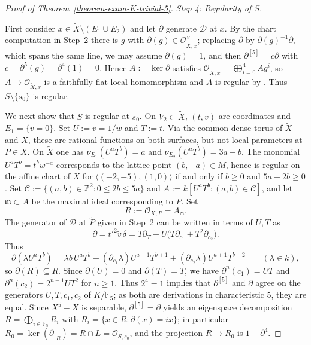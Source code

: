\documentclass[reqno,oneside]{amsart}
\theoremstyle{definition}
\theoremstyle{plain}
\numberwithin{equation}{section}
\begin{document}
\begin{proof}[Proof of Theorem~\ref{theorem-exam-K-trivial-5}]
  \medskip
  \emph{Step 4: Regularity of $S$.}
  
    \medskip
  First consider $x\in\widetilde X\setminus(E_1\cup E_2)$ and let $\partial$ generate $\mathcal D$ at $x$.
  By the chart computation in Step~2 there is $g$ with $\partial(g)\in\mathcal O_{\widetilde X,x}^\times$; replacing $\partial$ by $\partial(g)^{-1}\partial$, which spans the same line, we may assume $\partial(g)=1$, and then $\partial^{[5]}=c\partial$ with $c=\partial^5(g)=\partial^4(1)=0$.
  Hence $A:=\ker\partial$ satisfies $\mathcal O_{\widetilde X,x}=\bigoplus_{i=0}^{4}Ag^i$, so $A\to\mathcal O_{\widetilde X,x}$ is a faithfully flat local homomorphism and $A$ is regular by \cite[Theorem~23.7]{MatsumuraCRT}.
  Thus $S\setminus\{s_0\}$ is regular.

  We next show that $S$ is regular at $s_0$.
  On $V_2\subset\widetilde X$, $(t,v)$ are coordinates and $E_1=\{v=0\}$.
  Set $U:=v=1/w$ and $T:=t$.  Via the common dense torus of $\widetilde X$ and $X$, these are rational functions on both surfaces, but not local parameters at $P\in X$.
  On $\widetilde X$ one has $\nu_{E_1}(U^aT^b)=a$ and $\nu_{E_2}(U^aT^b)=3a-b$.
  The monomial $U^aT^b=t^bw^{-a}$ corresponds to the lattice point $(b,-a)\in M$, hence is regular on the affine chart of $X$ for $\langle(-2,-5),(1,0)\rangle$ if and only if $b\ge0$ and $5a-2b\ge0$.
  Set $\mathcal C:=\{(a,b)\in\mathbb Z^2:0\le2b\le5a\}$
  and $A:=k[U^aT^b:(a,b)\in\mathcal C]$, and let
  $\mathfrak m\subset A$ be the maximal ideal corresponding to $P$.
  Set
  \[
    R:=\mathcal O_{X,P}=A_{\mathfrak m}.
  \]
  The generator of $\mathcal D$ at $\widetilde P$ given in Step~2
  can be written in terms of $U,T$ as
  \[
    \partial=t'^2\tilde v\,\delta
      =T\partial_T+U\bigl(T\partial_{c_1}+T^2\partial_{c_2}\bigr).
  \]
  Thus
  \begin{equation}\label{equation-exam-5-partial}
    \partial(\lambda U^aT^b)=\lambda b\,U^aT^b+(\partial_{c_1}\lambda)U^{a+1}T^{b+1}+(\partial_{c_2}\lambda)U^{a+1}T^{b+2}
    \qquad(\lambda\in k),
  \end{equation}
  so $\partial(R)\subseteq R$.
  Since $\partial(U)=0$ and $\partial(T)=T$, we have $\partial^n(c_1)=UT$ and $\partial^n(c_2)=2^{n-1}UT^2$ for $n\ge1$.
  Thus $2^4=1$ implies that $\partial^{[5]}$ and $\partial$ agree on the generators $U,T,c_1,c_2$ of $K/\mathbb F_5$; as both are derivations in characteristic $5$, they are equal.
  Since \(X^5-X\) is separable, \(\partial^{[5]}=\partial\) yields an eigenspace decomposition \(R=\bigoplus_{i\in\mathbb F_5}R_i\) with \(R_i=\{x\in R:\partial(x)=ix\}\); in particular \(R_0=\ker(\partial|_R)=R\cap L=\mathcal O_{S,s_0}\), and the projection \(R\to R_0\) is \(1-\partial^4\).

\end{proof}
\end{document}
